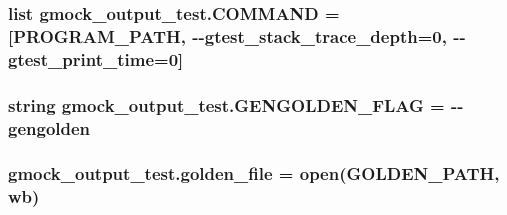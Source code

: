 \subsubsection[{\texorpdfstring{C\+O\+M\+M\+A\+ND}{COMMAND}}]{\setlength{\rightskip}{0pt plus 5cm}list gmock\+\_\+output\+\_\+test.\+C\+O\+M\+M\+A\+ND = \mbox{[}{\bf P\+R\+O\+G\+R\+A\+M\+\_\+\+P\+A\+TH}, \textquotesingle{}-\/-\/gtest\+\_\+stack\+\_\+trace\+\_\+depth=0\textquotesingle{}, \textquotesingle{}-\/-\/gtest\+\_\+print\+\_\+time=0\textquotesingle{}\mbox{]}}\hypertarget{namespacegmock__output__test_a33f8ca97d99711e23517962ca4c729af}{}\label{namespacegmock__output__test_a33f8ca97d99711e23517962ca4c729af}
\subsubsection[{\texorpdfstring{G\+E\+N\+G\+O\+L\+D\+E\+N\+\_\+\+F\+L\+AG}{GENGOLDEN_FLAG}}]{\setlength{\rightskip}{0pt plus 5cm}string gmock\+\_\+output\+\_\+test.\+G\+E\+N\+G\+O\+L\+D\+E\+N\+\_\+\+F\+L\+AG = \textquotesingle{}-\/-\/gengolden\textquotesingle{}}\hypertarget{namespacegmock__output__test_a0bd3131fe8262154217588fed6b28d45}{}\label{namespacegmock__output__test_a0bd3131fe8262154217588fed6b28d45}
\subsubsection[{\texorpdfstring{golden\+\_\+file}{golden_file}}]{\setlength{\rightskip}{0pt plus 5cm}gmock\+\_\+output\+\_\+test.\+golden\+\_\+file = open({\bf G\+O\+L\+D\+E\+N\+\_\+\+P\+A\+TH}, \textquotesingle{}wb\textquotesingle{})}\hypertarget{namespacegmock__output__test_aa592d26826a4dabf494fc2dd3c5c8b1e}{}\label{namespacegmock__output__test_aa592d26826a4dabf494fc2dd3c5c8b1e}
